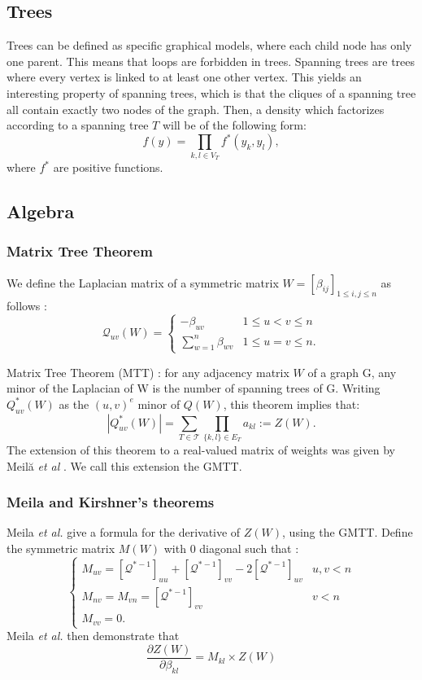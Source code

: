 \documentclass[a4paper,11pt]{article}
\begin{document}
  \subsection{Trees}
  Trees can be defined as specific graphical models, where each child node has only one parent. This means that loops are forbidden in trees.
  Spanning trees are trees where every vertex is linked to at least one other vertex. This yields an interesting property of spanning trees, which 
  is that the cliques of a spanning tree all contain exactly two nodes of the graph. Then, a density which factorizes according to a spanning
  tree $T$ will be of the following form:
  \[f(y)= \prod_{k,l\in V_T} f^*(y_k,y_l),\]
  where $f^*$ are positive functions.
  
  \subsection{Algebra}
    \subsubsection{Matrix Tree Theorem}
    We define the Laplacian matrix of a symmetric matrix $W=[\beta_{ij}]_{1\leq i,j\leq n}$ as follows :
 \[\mathcal{Q}_{uv}(W)=\begin{cases}
               -\beta_{uv} & 1\leq u<v \leq n\\
               \sum_{w=1}^n \beta_{wv} & 1\leq u=v \leq n.
            \end{cases}\]
    
    Matrix Tree Theorem (MTT) \cite{kirch}: for any adjacency matrix $W$ of a graph G, any minor of the Laplacian of W is the number 
    of spanning trees of G. Writing $Q^*_{uv}(W)$ as the $(u,v)^e$ minor of $Q(W)$, this theorem implies that:
    \[ |Q^*_{uv}(W)|=\sum_{T\in\mathcal{T}} \prod_{\{k,l\}\in E_T} a_{kl} := Z(W).\]
   The extension of this theorem to a real-valued matrix of weights was given by Meil{\u{a}} \textit{et al} \cite{meila}.
 We call this extension the GMTT.
    \subsubsection{Meila and Kirshner's theorems}
    
     Meila \textit{et al.} give a formula for the derivative of $Z(W)$, using the GMTT. Define the symmetric matrix  $M(W)$ 
     with 0 diagonal such that :
 \[\begin{cases}
    M_{uv} = [\mathcal{Q}^{*-1}]_{uu} + [\mathcal{Q}^{*-1}]_{vv} -2[\mathcal{Q}^{*-1}]_{uv} & u,v < n\\
    M_{nv} =M_{vn} =[\mathcal{Q}^{*-1}]_{vv} & v<n\\
     M_{vv} =0.
   \end{cases}\]
Meila \textit{et al.} then demonstrate that 
\begin{equation}
\label{meila}
 \frac{\partial Z(W)}{\partial \beta_{kl}} = M_{kl} \times Z(W)
\end{equation}
\end{document}
